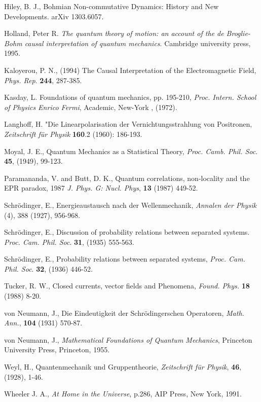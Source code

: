 \documentclass[12pt]{article}
\begin{document}
\begin{thebibliography}{99}
 Hiley, B. J., Bohmian Non-commutative Dynamics: History and New Developments. arXiv 1303.6057.

 Holland, Peter R. {\em The quantum theory of motion: an account of the de Broglie-Bohm causal interpretation of quantum mechanics}. Cambridge university press, 1995.

 Kaloyerou, P. N., (1994) The Causal Interpretation of the Electromagnetic Field, {\em Phys. Rep}. {\bf 244}, 287-385.

 Kasday, L. Foundations of quantum mechanics,  pp. 195-210, {\em Proc. Intern. School of Physics Enrico Fermi}, Academic, New-York ,  (1972).


 Langhoff, H. "Die Linearpolarisation der Vernichtungsstrahlung von Positronen, {\em Zeitschrift f\"{u}r Physik} {\bf 160}.2 (1960): 186-193.

  Moyal, J. E., Quantum Mechanics as a Statistical Theory, {\em Proc. Camb. Phil. Soc}. {\bf 45}, (1949), 99-123.


   Paramananda, V. and  Butt, D. K., Quantum correlations, non-locality and the EPR paradox, 1987 {\em J. Phys. G: Nucl. Phys}, {\bf 13} (1987)  449-52.

  Schr\"{o}dinger, E., Energieaustausch nach der Wellenmechanik, {\em Annalen der Physik} (4), 388 (1927), 956-968. 

 Schr\"{o}dinger, E., Discussion of probability relations between separated systems.  {\em Proc. Cam. Phil. Soc}.  {\bf 31}, (1935) 555-563.

 Schr\"{o}dinger, E., Probability relations between separated systems, {\em Proc. Cam. Phil. Soc}.  {\bf 32}, (1936) 446-52. 

 Tucker, R. W., Closed currents, vector fields and Phenomena, {\em Found. Phys.} {\bf 18} (1988) 8-20.

 von Neumann, J., Die Eindeutigkeit der Schr\"{o}dingerschen Operatoren, {\em Math. Ann.}, {\bf 104} (1931) 570-87.

 von Neumann, J., {\em Mathematical Foundations of Quantum Mechanics}, Princeton University Press, Princeton, 1955.

  Weyl, H.,  Quantenmechanik und Gruppentheorie, {\em Zeitschrift f\"{u}r Physik}, {\bf 46}, (1928), 1-46.

 Wheeler J. A.,  {\em At Home in the Universe}, p.286, AIP Press, New York, 1991.


\end{thebibliography}
\end{document}
